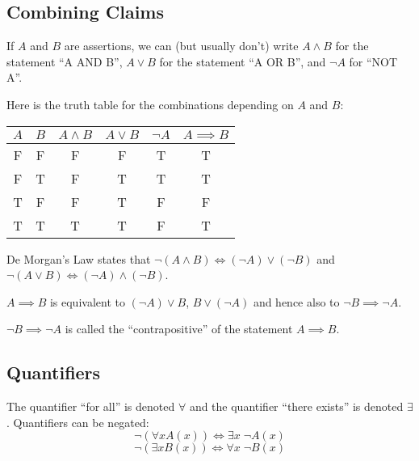 \documentclass[../main.tex]{subfiles}
\begin{document}
\subsection{Combining Claims}
If $A$ and $B$ are assertions, we can (but usually don't) write $A \land B$ for the statement ``A AND B'', $A \lor B$ for the statement ``A OR B'', and $\lnot A$ for ``NOT A''.

Here is the truth table for the combinations depending on $A$ and $B$:\par
\begin{center}
\begin{tabular}{c|c|c|c|c|c}
  $A$ & $B$ & $A \land B$ & $A \lor B$ & $\lnot A$ & $A \implies B$ \\
\hline
  F & F & F & F & T & T \\
  F & T & F & T & T & T \\
  T & F & F & T & F & F \\
  T & T & T & T & F & T
\end{tabular}
\end{center}\par
De Morgan's Law states that $\lnot (A \land B) \iff (\lnot A) \lor (\lnot B)$ and $\lnot (A \lor B) \iff (\lnot A) \land (\lnot B)$.

$A \implies B$ is equivalent to $(\lnot A) \lor B$, $B \lor (\lnot A)$ and hence also to $\lnot B \implies \lnot A$.

$\lnot B \implies \lnot A$ is called the ``contrapositive'' of the statement $A \implies B$.

\subsection{Quantifiers}
The quantifier ``for all'' is denoted $\forall$ and the quantifier ``there exists'' is denoted $\exists$.
Quantifiers can be negated:
\[
  \lnot (\forall x A(x)) \iff \exists x\; \lnot A(x) 
\]
\[
  \lnot (\exists x B(x)) \iff \forall x\; \lnot B(x) 
\]
\end{document}
